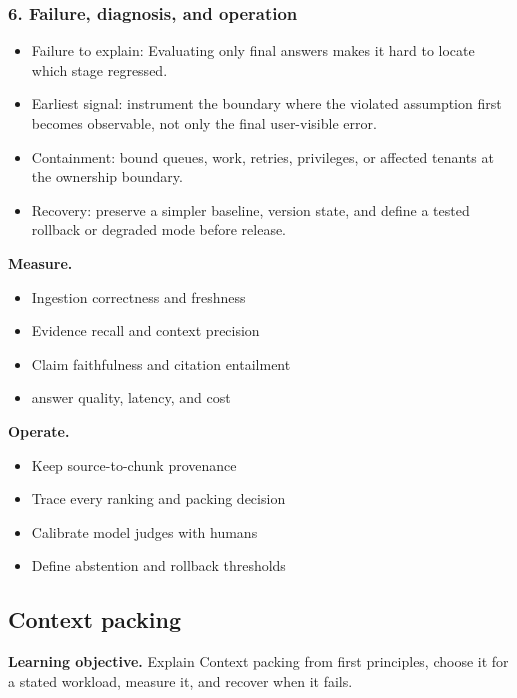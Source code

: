 \subsubsection*{6. Failure, diagnosis, and operation}
\begin{itemize}
\item Failure to explain: Evaluating only final answers makes it hard to locate which stage regressed.
\item Earliest signal: instrument the boundary where the violated assumption first becomes observable, not only the final user-visible error.
\item Containment: bound queues, work, retries, privileges, or affected tenants at the ownership boundary.
\item Recovery: preserve a simpler baseline, version state, and define a tested rollback or degraded mode before release.
\end{itemize}
\textbf{Measure.}\begin{itemize}
\item Ingestion correctness and freshness
\item Evidence recall and context precision
\item Claim faithfulness and citation entailment
\item answer quality, latency, and cost
\end{itemize}
\textbf{Operate.}\begin{itemize}
\item Keep source-to-chunk provenance
\item Trace every ranking and packing decision
\item Calibrate model judges with humans
\item Define abstention and rollback thresholds
\end{itemize}
\subsection{Context packing}
\textbf{Learning objective.} Explain Context packing from first principles, choose it for a stated workload, measure it, and recover when it fails.
